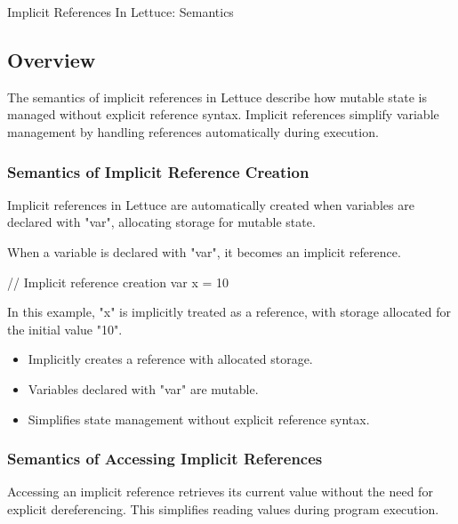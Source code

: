 \begin{notes}{Implicit References In Lettuce: Semantics}
    \subsection*{Overview}

    The semantics of implicit references in Lettuce describe how mutable state is managed without explicit reference syntax. Implicit references simplify variable management by handling references automatically during execution.
    
    \subsubsection*{Semantics of Implicit Reference Creation}
    
    Implicit references in Lettuce are automatically created when variables are declared with "var", allocating storage for mutable state.
    
    \begin{highlight}
    
        When a variable is declared with "var", it becomes an implicit reference.
    
    \begin{code}[Lettuce]
    // Implicit reference creation
    var x = 10
    \end{code}
    
        In this example, "x" is implicitly treated as a reference, with storage allocated for the initial value "10".
    
        \begin{itemize}
            \item Implicitly creates a reference with allocated storage.
            \item Variables declared with "var" are mutable.
            \item Simplifies state management without explicit reference syntax.
        \end{itemize}
    
    \end{highlight}
    
    \subsubsection*{Semantics of Accessing Implicit References}
    
    Accessing an implicit reference retrieves its current value without the need for explicit dereferencing. This simplifies reading values during program execution.
    

\end{notes}
